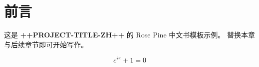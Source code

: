 \chapter*{前言}

这是 \textbf{++PROJECT-TITLE-ZH++} 的 Rose Pine 中文书模板示例。
替换本章与后续章节即可开始写作。

\begin{formulabox}
\[
  e^{i\pi} + 1 = 0
\]
\end{formulabox}

